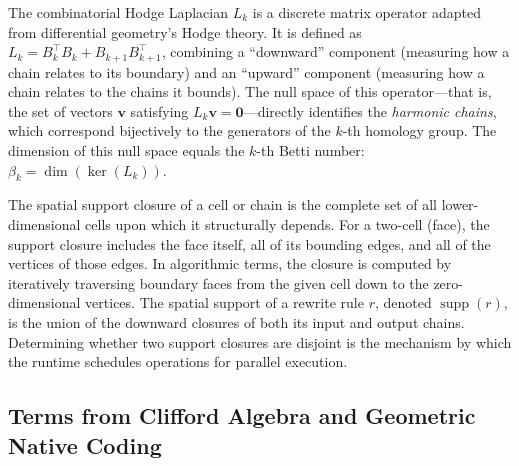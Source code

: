 \documentclass[manuscript, nonacm, review=false]{acmart}
\theoremstyle{definition}
\theoremstyle{plain}
\newcommand{\supp}{\operatorname{supp}}
\begin{document}
\begin{description}[style=unboxed, leftmargin=0cm, font=\bfseries]
\item[Combinatorial Hodge Laplacian]
The combinatorial Hodge Laplacian $L_k$ is a discrete matrix operator adapted from differential geometry's Hodge theory. It is defined as $L_k = B_k^\top B_k + B_{k+1} B_{k+1}^\top$, combining a ``downward'' component (measuring how a chain relates to its boundary) and an ``upward'' component (measuring how a chain relates to the chains it bounds). The null space of this operator---that is, the set of vectors $\mathbf{v}$ satisfying $L_k \mathbf{v} = \mathbf{0}$---directly identifies the \emph{harmonic chains}, which correspond bijectively to the generators of the $k$-th homology group. The dimension of this null space equals the $k$-th Betti number: $\beta_k = \dim(\ker(L_k))$.

\item[Spatial Support Closure]
The spatial support closure of a cell or chain is the complete set of all lower-dimensional cells upon which it structurally depends. For a two-cell (face), the support closure includes the face itself, all of its bounding edges, and all of the vertices of those edges. In algorithmic terms, the closure is computed by iteratively traversing boundary faces from the given cell down to the zero-dimensional vertices. The spatial support of a rewrite rule $r$, denoted $\supp(r)$, is the union of the downward closures of both its input and output chains. Determining whether two support closures are disjoint is the mechanism by which the runtime schedules operations for parallel execution.

\end{description}


\subsection{Terms from Clifford Algebra and Geometric Native Coding}
\label{subsec:terms_clifford}
\end{document}
